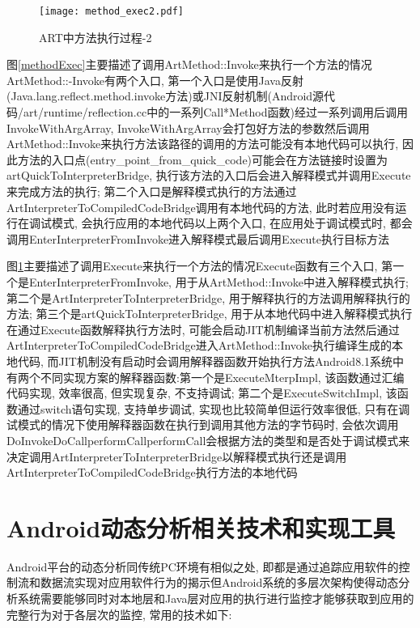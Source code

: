 \begin{figure}[ht]
	\centering
	\texttt{[image: method\_exec2.pdf]}
	\caption{ART中方法执行过程-2}
	\label{methodExec2}
\end{figure}
图\ref{methodExec}主要描述了调用ArtMethod::Invoke来执行一个方法的情况\juhao ArtMethod::-Invoke有两个入口, 第一个入口是使用Java反射(Java.lang.reflect.method.invoke方法)或JNI反射机制(Android源代码/art/runtime/reflection.cc中的一系列Call*Method函数)经过一系列调用后调用InvokeWithArgArray,  InvokeWithArgArray会打包好方法的参数然后调用ArtMethod::Invoke来执行方法\juhao 该路径的调用的方法可能没有本地代码可以执行, 因此方法的入口点(entry\_point\_from\_quick\_code)可能会在方法链接时设置为artQuickToInterpreterBridge, 执行该方法的入口后会进入解释模式并调用Execute来完成方法的执行; 第二个入口是解释模式执行的方法通过ArtInterpreterToCompiledCodeBridge调用有本地代码的方法, 此时若应用没有运行在调试模式, 会执行应用的本地代码\juhao 以上两个入口, 在应用处于调试模式时, 都会调用EnterInterpreterFromInvoke进入解释模式最后调用Execute执行目标方法\juhao 

图\ref{methodExec2}主要描述了调用Execute来执行一个方法的情况\juhao Execute函数有三个入口, 第一个是EnterInterpreterFromInvoke, 用于从ArtMethod::Invoke中进入解释模式执行; 第二个是ArtInterpreterToInterpreterBridge, 用于解释执行的方法调用解释执行的方法; 第三个是artQuickToInterpreterBridge, 用于从本地代码中进入解释模式执行\juhao
在通过Execute函数解释执行方法时, 可能会启动JIT机制编译当前方法然后通过ArtInterpreterToCompiledCodeBridge进入ArtMethod::Invoke执行编译生成的本地代码, 而JIT机制没有启动时会调用解释器函数开始执行方法\juhao Android8.1系统中有两个不同实现方案的解释器函数:第一个是ExecuteMterpImpl, 该函数通过汇编代码实现, 效率很高, 但实现复杂, 不支持调试; 第二个是ExecuteSwitchImpl, 该函数通过switch语句实现, 支持单步调试, 实现也比较简单但运行效率很低, 只有在调试模式的情况下使用\juhao 解释器函数在执行到调用其他方法的字节码时, 会依次调用DoInvoke\dunhao DoCall\dunhao performCall\juhao performCall会根据方法的类型和是否处于调试模式来决定调用ArtInterpreterToInterpreterBridge以解释模式执行还是调用ArtInterpreterToCompiledCodeBridge执行方法的本地代码\juhao 


\section{Android动态分析相关技术和实现工具}
Android平台的动态分析同传统PC环境有相似之处, 即都是通过追踪应用软件的控制流和数据流实现对应用软件行为的揭示\juhao 但Android系统的多层次架构使得动态分析系统需要能够同时对本地层和Java层对应用的执行进行监控才能够获取到应用的完整行为\juhao 对于各层次的监控, 常用的技术如下:

